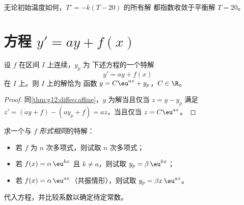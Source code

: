 \begin{omfigure}

{\small 无论初始温度如何，$T' = -k(T - 20)$ 的所有解
都指数收敛于平衡解 $T = 20$。}
\end{omfigure}

\section{方程 \texorpdfstring{$y' = ay + f(x)$}{y' = ay + f(x)}}

\begin{proposition}[解集的结构]\label{prop:g12:diffeq:general}
设 $f$ 在区间 $I$ 上连续，$y_p$ 为
下述方程的一个特解
\[
y' = ay + f(x)
\]
在 $I$ 上。则 $I$ 上的解恰为
函数 $y = C\eu^{ax} + y_p$，$C \in \R$。
\end{proposition}

\begin{proof}
同\cref{thm:g12:diffeq:affine}，$y$ 为解当且仅当
$z = y - y_p$ 满足
$z' = (ay + f) - (ay_p + f) = az$，当且仅当 $z = C\eu^{ax}$。
\end{proof}

\begin{method}[猜测特解]\label{met:g12:diffeq:particular}
求一个与 $f$ \emph{形式相同}的特解：
\begin{itemize}
  \item 若 $f$ 为 $n$ 次多项式，则试取 $n$ 次多项式；
  \item 若 $f(x) = \alpha\,\eu^{kx}$ 且 $k \neq a$，则试取 $y_p = \beta\,\eu^{kx}$；
  \item 若 $f(x) = \alpha\,\eu^{ax}$（共振情形），则试取
        $y_p = \beta x\,\eu^{ax}$。
\end{itemize}
代入方程，并比较系数以确定待定常数。
\end{method}

